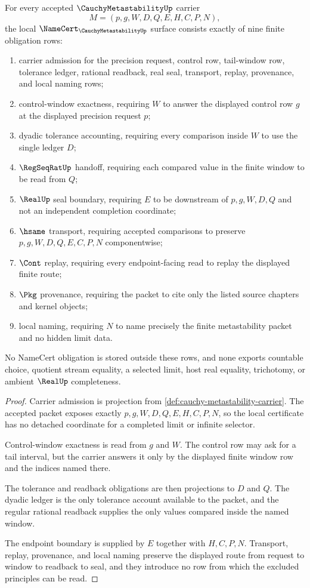 \begin{theorem}\label{thm:cauchy-metastability-namecert-obligations}
For every accepted $\CauchyMetastabilityUp$ carrier
$$
M=(p,g,W,D,Q,E,H,C,P,N),
$$
the local $\NameCert_{\CauchyMetastabilityUp}$ surface consists exactly of nine finite obligation rows:
\begin{enumerate}
\item carrier admission for the precision request, control row, tail-window row, tolerance ledger, rational readback, real seal, transport, replay, provenance, and local naming rows;
\item control-window exactness, requiring $W$ to answer the displayed control row $g$ at the displayed precision request $p$;
\item dyadic tolerance accounting, requiring every comparison inside $W$ to use the single ledger $D$;
\item $\RegSeqRatUp$ handoff, requiring each compared value in the finite window to be read from $Q$;
\item $\RealUp$ seal boundary, requiring $E$ to be downstream of $p,g,W,D,Q$ and not an independent completion coordinate;
\item $\hsame$ transport, requiring accepted comparisons to preserve $p,g,W,D,Q,E,C,P,N$ componentwise;
\item $\Cont$ replay, requiring every endpoint-facing read to replay the displayed finite route;
\item $\Pkg$ provenance, requiring the packet to cite only the listed source chapters and kernel objects;
\item local naming, requiring $N$ to name precisely the finite metastability packet and no hidden limit data.
\end{enumerate}
No NameCert obligation is stored outside these rows, and none exports countable choice, quotient stream equality, a selected limit, host real equality, trichotomy, or ambient $\RealUp$ completeness.
\end{theorem}
\begin{proof}
Carrier admission is projection from \autoref{def:cauchy-metastability-carrier}. The accepted packet exposes exactly $p,g,W,D,Q,E,H,C,P,N$, so the local certificate has no detached coordinate for a completed limit or infinite selector.

Control-window exactness is read from $g$ and $W$. The control row may ask for a tail interval, but the carrier answers it only by the displayed finite window row and the indices named there.

The tolerance and readback obligations are then projections to $D$ and $Q$. The dyadic ledger is the only tolerance account available to the packet, and the regular rational readback supplies the only values compared inside the named window.

The endpoint boundary is supplied by $E$ together with $H,C,P,N$. Transport, replay, provenance, and local naming preserve the displayed route from request to window to readback to seal, and they introduce no row from which the excluded principles can be read.
\end{proof}

